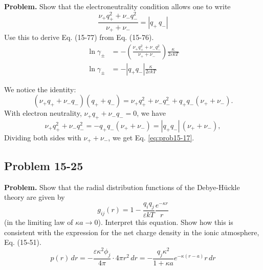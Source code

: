 \documentclass[twocolumn, 10pt]{article}
\numberwithin{equation}{section}
\newenvironment{problem}
{\par\medskip \color{problue}
  \textbf{Problem. }\ignorespaces}
{\medskip}
\newenvironment{solution}[1][\empty]
{\par\medskip\sffamily
  \textbf{\ifx\empty#1{Solution.}\relax\else{#1}\fi} \ignorespaces}
{\medskip}
\begin{document}
\begin{problem}
  Show that the electroneutrality condition allows one to write
  \begin{equation}
  \frac{ \nu_+ q_+^2 + \nu_- q_-^2 }
   { \nu_+ + \nu_- }
  =
  |q_+ \, q_-|
    \label{eq:prob15-17}
  \end{equation}
  Use this to derive Eq. (15-77) from Eq. (15-76).
  \begin{align}
    \ln \gamma_\pm
    &=
    -
    \left(
    \frac{ \nu_+ q_+^2 + \nu_- q_-^2 }
    { \nu_+ + \nu_- }
    \right)
    \frac{ \kappa } { 2 \varepsilon k T }
    \tag{15-76}
    \\
    \ln \gamma_\pm
    &=
    -|q_+ q_-|
    \frac{ \kappa } { 2 \varepsilon k T }
    \tag{15-77}
  \end{align}
\end{problem}

\begin{solution}
  We notice the identity:
  $$
  (\nu_+ q_+ + \nu_- q_-) (q_+ + q_-)
  =
  \nu_+ q_+^2 + \nu_- q_-^2
  +
  q_+ q_- (\nu_+ + \nu_-).
  $$
  With electron neutrality,
  $\nu_+ q_+ + \nu_- q_- = 0$,
  we have
  $$
  \nu_+ q_+^2 + \nu_- q_-^2
  =
  -q_+ q_- (\nu_+ + \nu_-)
  =
  |q_+ q_-| \, (\nu_+ + \nu_-)
  ,
  $$
  Dividing both sides with $\nu_+ + \nu_-$,
  we get Eq. \eqref{eq:prob15-17}.
\end{solution}

\subsection{Problem 15-25}

\begin{problem}
  Show that the radial distribution functions of the Debye-H\"uckle theory
  are given by
  \begin{equation}
  g_{ij}(r) = 1 - \frac{ q_i q_j } { \varepsilon k T } \frac{ e^{-\kappa r} } { r }
    \label{eq:gij_DH}
  \end{equation}
  (in the limiting law of $\kappa a \to 0$).
  Interpret this equation.
  Show how this is consistent with the expression for the net charge density
  in the ionic atmosphere, Eq. (15-51).
  \begin{equation}
    p(r) \, dr
    =
    -
    \frac{ \varepsilon \kappa^2 \phi_j } { 4 \pi } \cdot
    4 \pi r^2 \, dr
    =
    -
    \frac{ q_j \kappa^2 } { 1 + \kappa a }
    e^{-\kappa(r - a)} r \, dr
    \tag{15-51}
  \end{equation}
\end{problem}
\end{document}
